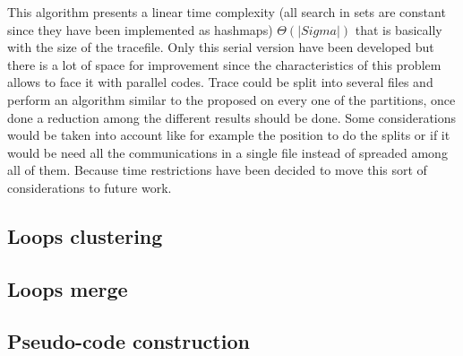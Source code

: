 This algorithm presents a linear time complexity (all search in sets are
constant since they have been implemented as hashmaps) $\Theta(|Sigma|)$ that is
basically with the size of the tracefile. Only this serial version have been
developed but there is a lot of space for improvement since the characteristics
of this problem allows to face it with parallel codes. Trace could be split into
several files and perform an algorithm similar to the proposed on every one of
the partitions, once done a reduction among the different results should be
done. Some considerations would be taken into account like for example the
position to do the splits or if it would be need all the communications in a
single file instead of spreaded among all of them. Because time restrictions
have been decided to move this sort of considerations to future work.

\subsection{Loops clustering}

\subsection{Loops merge}

\subsection{Pseudo-code construction}
